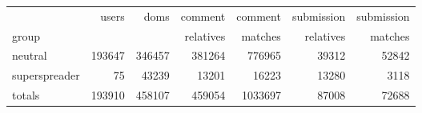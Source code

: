 \begin{tabular}{lrrrrrr}
\toprule
{} &   users &    doms &  comment &  comment &  submission &  submission \\
group         &         & & relatives & matches & relatives & matches \\
\midrule
neutral       &  193647 &  346457 &           381264 &             776965 &               39312 &                 52842 \\
superspreader &      75 &   43239 &            13201 &              16223 &               13280 &                  3118 \\
totals        &  193910 &  458107 &           459054 &            1033697 &               87008 &                 72688 \\
\bottomrule
\end{tabular}
